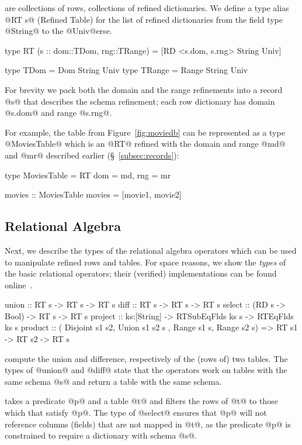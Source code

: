  are collections of rows, 
\ie collections of refined dictionaries.
%
We define a type alias @RT s@ (Refined Table) for 
the list of refined dictionaries from the field 
type @String@ to the @Univ@erse.
%
\begin{code}
  type RT (s :: {dom::TDom, rng::TRange}) 
    = [RD <s.dom, s.rng> String Univ]

  type TDom   = Dom   String Univ
  type TRange = Range String Univ
\end{code}
%
For brevity we pack both the domain and the range 
refinements into a record @s@ that describes the 
schema refinement; \ie each row dictionary has 
domain @s.dom@ and range @s.rng@.

For example, the table from Figure~\ref{fig:moviedb}
can be represented as a type @MoviesTable@ which 
is an @RT@ refined with the domain and range @md@ 
and @mr@ described earlier (\S~\ref{subsec:records}):
%
\begin{code}
  type MoviesTable = RT {dom = md, rng = mr}
   
  movies :: MoviesTable 
  movies = [movie1, movie2]
\end{code}

\subsection{Relational Algebra}\label{subsec:relational}

Next, we describe the types of the relational algebra operators
which can be used to manipulate refined rows and tables.
For space reasons, we show the \emph{types} of the basic 
relational operators; their (verified) implementations 
can be found online~\cite{liquidhaskellgithub}.
%
\begin{code}
  union   :: RT s -> RT s -> RT s
  diff    :: RT s -> RT s -> RT s
  select  :: (RD s -> Bool) -> RT s -> RT s
  project :: ks:[String] -> RTSubEqFlds ks s 
          -> RTEqFlds ks s
  product :: ( Disjoint s1 s2, Union s1 s2 s
             , Range s1 s, Range s2 s) 
          => RT s1 -> RT s2 -> RT s
\end{code}

 compute the union 
and difference, respectively of the (rows of) two tables.
%
The types of @union@ and @diff@ state that the 
operators work on tables with the same schema 
@s@ and return a table with the same schema.

 takes a predicate @p@
and a table @t@ and filters the rows of @t@ 
to those which that satisfy @p@.
%
The type of @select@ ensures that @p@ will 
not reference columns (fields) that are
not mapped in @t@, as the predicate @p@
is constrained to require a dictionary 
with schema @s@.

